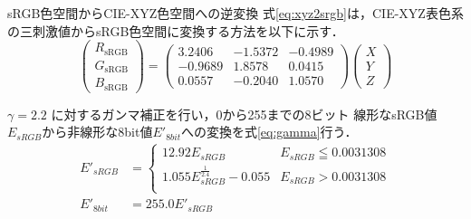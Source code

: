 \documentclass[8pt, jfont=ipaexm, t]{beamer} %
\begin{document}
\begin{frame}{sRGB色空間からCIE-XYZ色空間への逆変換}
式\eqref{eq:xyz2srgb}は，CIE-XYZ表色系の三刺激値からsRGB色空間に変換する方法を以下に示す．
\begin{equation}\label{eq:xyz2srgb}
\begin{pmatrix}
R_{\text{sRGB}} \\
G_{\text{sRGB}} \\
B_{\text{sRGB}}
\end{pmatrix}
=
\begin{pmatrix}
3.2406 & -1.5372 & -0.4989 \\
-0.9689 & 1.8578 & 0.0415 \\
0.0557 & -0.2040 & 1.0570
\end{pmatrix}
\begin{pmatrix}
X \\
Y \\
Z
\end{pmatrix}
\end{equation}

\(\gamma = 2.2\) に対するガンマ補正を行い，0から255までの8ビット
線形なsRGB値 \(E_{sRGB}\)から非線形な8bit値\(E'_{8bit}\)への変換を式\eqref{eq:gamma}行う．
\begin{equation}\label{eq:gamma}
\begin{aligned}
E'_{sRGB} &=
\begin{cases}
12.92 E_{sRGB} & E_{sRGB} \leqq 0.0031308 \\
1.055 E_{sRGB}^{\frac{1}{2.4}} - 0.055 & E_{sRGB} > 0.0031308 \\
\end{cases} \\
E'_{8bit} &=255.0E'_{sRGB}
\end{aligned}
\end{equation}
\end{frame}
\end{document}
